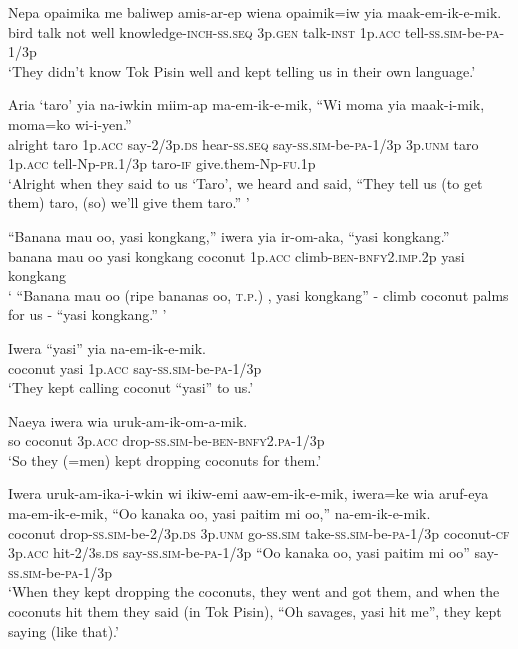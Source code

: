 \ea
\gll  Nepa  opaimika  me  baliwep  amis-ar-ep wiena  opaimik=iw  yia  maak-em-ik-e-mik. \\
bird  talk  not  well  knowledge-\textsc{inch}-\textsc{ss.seq} 3p.\textsc{gen}  talk-\textsc{inst}  1p.\textsc{acc}  tell-\textsc{ss}.\textsc{sim}-be-\textsc{pa}-1/3p\\ 
\glt ‘They didn’t know Tok Pisin well and kept telling us in their own language.’ \\
\z


\ea
\gll  Aria  ‘taro’  yia  na-iwkin  miim-ap ma-em-ik-e-mik,  “Wi  moma  yia  maak-i-mik,  moma=ko  wi-i-yen.” \\
alright  taro  1p.\textsc{acc}  say-2/3p.\textsc{ds}  hear-\textsc{ss.seq} say-\textsc{ss}.\textsc{sim}-be-\textsc{pa}-1/3p  3p.\textsc{unm}  taro  1p.\textsc{acc} tell-Np-\textsc{pr}.1/3p  taro-\textsc{if}  give.them-Np-\textsc{fu}.1p \\
\glt ‘Alright when they said to us ‘Taro’, we heard and said, “They tell us (to get them) taro, (so) we’ll give them taro.” ’ \\
\z


\ea
\gll  “Banana  mau  oo,  yasi  kongkang,” iwera  yia  ir-om-aka,  “yasi  kongkang.” \\
banana  mau  oo  yasi  kongkang coconut  1p.\textsc{acc}  climb-\textsc{ben}-\textsc{bnfy}2.\textsc{imp}.2p  yasi  kongkang \\ 
\glt ‘ “Banana mau oo (ripe bananas oo, \textsc{t.p.}) , yasi kongkang” - climb coconut palms for us - “yasi kongkang.” ’ \\
\z


\ea
\gll  Iwera  “yasi”  yia  na-em-ik-e-mik. \\
coconut  yasi  1p.\textsc{acc}  say-\textsc{ss}.\textsc{sim}-be-\textsc{pa}-1/3p \\
\glt ‘They kept calling coconut “yasi” to us.’ \\
\z


\ea
\gll  Naeya  iwera  wia  uruk-am-ik-om-a-mik. \\
so  coconut  3p.\textsc{acc}  drop-\textsc{ss}.\textsc{sim}-be-\textsc{ben}-\textsc{bnfy}2.\textsc{pa}-1/3p \\
\glt ‘So they (=men) kept dropping coconuts for them.’ \\
\z


\ea
\gll  Iwera  uruk-am-ika-i-wkin  wi  ikiw-emi  aaw-em-ik-e-mik,  iwera=ke  wia  aruf-eya   ma-em-ik-e-mik,  “Oo  kanaka  oo,  yasi  paitim  mi  oo,” na-em-ik-e-mik. \\
coconut  drop-\textsc{ss}.\textsc{sim}-be-2/3p.\textsc{ds}  3p.\textsc{unm}  go-\textsc{ss}.\textsc{sim} take-\textsc{ss}.\textsc{sim}-be-\textsc{pa}-1/3p  coconut-\textsc{cf}  3p.\textsc{acc}  hit-2/3s.\textsc{ds} say-\textsc{ss}.\textsc{sim}-be-\textsc{pa}-1/3p  “Oo  kanaka  oo,  yasi  paitim  mi  oo” say-\textsc{ss}.\textsc{sim}-be-\textsc{pa}-1/3p\\
\glt ‘When they kept dropping the coconuts, they went and got them, and when the coconuts hit them they said (in Tok Pisin), “Oh savages, yasi hit me”, they kept saying (like that).’ \\
\z


